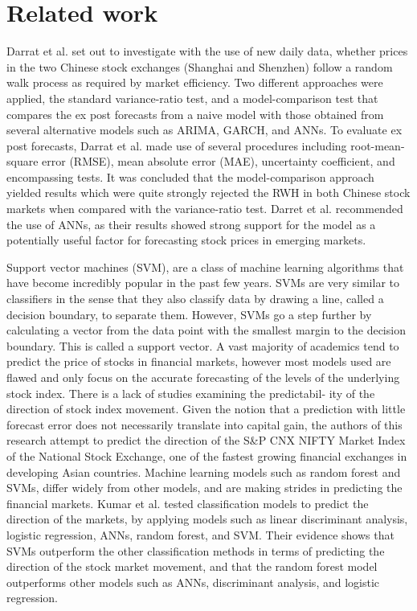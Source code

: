 \documentclass[times]{jtitauth}
\begin{document}
\section{Related work}
Darrat et al. set out to investigate with the use of new daily data, whether prices in the two Chinese stock exchanges (Shanghai and Shenzhen) follow a random walk process as required by market efficiency. Two different approaches were applied, the standard variance-ratio test, and a model-comparison test that compares the ex post forecasts from a naive model with those obtained from several alternative models such as ARIMA, GARCH, and ANNs. To evaluate ex post forecasts, Darrat et al. made use of several procedures including root-mean-square error (RMSE), mean absolute error (MAE), uncertainty coefficient, and encompassing tests. It was concluded that the model-comparison approach yielded results which were quite strongly rejected the RWH in both Chinese stock markets when compared with the variance-ratio test. Darret et al. recommended the use of ANNs, as their results showed strong support for the model
as a potentially useful factor for forecasting stock prices in emerging markets.

Support vector machines (SVM), are a class of machine learning algorithms that have become incredibly popular in the past few years. SVMs are very similar to classifiers in the sense that they also classify data by drawing a line, called a decision boundary, to separate them. However, SVMs go a step further by calculating a vector from the data point with the smallest margin to the decision boundary. This is called a support vector. A vast majority of academics tend to predict the price of stocks in financial markets, however most models used are flawed and only focus on the accurate forecasting of the levels of the underlying stock index. There is a lack of studies examining the predictabil- ity of the direction of stock index movement. Given the notion that a prediction with little forecast error does not necessarily translate into capital gain, the authors of this research attempt to predict the direction of the S&P CNX NIFTY Market Index of the National Stock Exchange, one of the fastest growing financial exchanges in developing Asian countries. Machine learning models such as random forest and SVMs, differ widely from other models, and are making strides in predicting the financial markets. Kumar et al. tested classification models to predict the direction of the markets, by applying models such as linear discriminant analysis, logistic regression, ANNs, random forest, and SVM. Their evidence shows that SVMs outperform the other classification methods in terms of predicting the direction of the stock market movement, and that the random forest model outperforms other models such as ANNs, discriminant analysis, and logistic regression.
\end{document}

